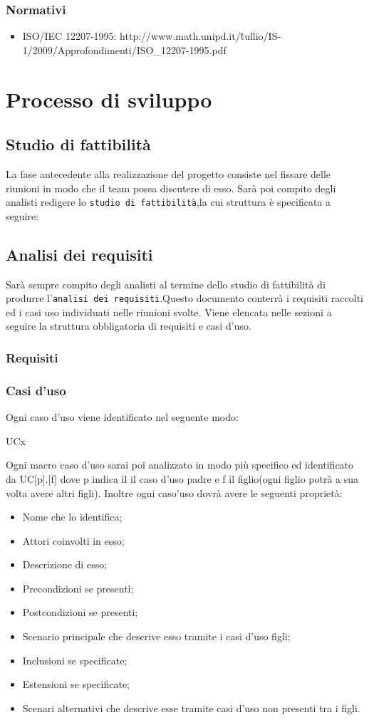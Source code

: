		\subsubsection{Normativi}
		\begin{itemize}
		\item ISO/IEC 12207-1995: http://www.math.unipd.it/\~tullio/IS-1/2009/Approfondimenti/ISO\_12207-1995.pdf
		\end{itemize}
\section{Processo di sviluppo}

	\subsection{Studio di fattibilità}
	La fase antecedente alla realizzazione del progetto consiste nel fissare delle riunioni in modo che il team possa discutere di esso. Sarà poi compito degli analisti redigere lo \texttt{studio di fattibilità},la cui struttura è specificata a seguire: %
	\subsection{Analisi dei requisiti}
	Sarà sempre compito degli analisti al termine dello studio di fattibilità di produrre l'\texttt{analisi dei requisiti}.Questo documento conterrà i requisiti raccolti ed i casi uso individuati nelle riunioni svolte.
	Viene elencata nelle sezioni a seguire la struttura obbligatoria di requisiti e casi d'uso.
		\subsubsection{Requisiti}
		\subsubsection{Casi d'uso}
		Ogni caso d'uso viene identificato nel seguente modo:
		\centerline{UCx}
		Ogni macro caso d'uso sarai poi analizzato in modo più specifico ed identificato da UC[p].[f] dove p indica il il caso d'uso padre e f il figlio(ogni figlio potrà a sua volta avere altri figli).
		Inoltre ogni caso'uso dovrà avere le seguenti proprietà:
		\begin{itemize}
		\item Nome che lo identifica;
		\item Attori coinvolti in esso;
		\item Descrizione di esso;
		\item Precondizioni se presenti;
		\item Postcondizioni se presenti;
		\item Scenario principale che descrive esso tramite i casi d'uso figli;
		\item Inclusioni se specificate;
		\item Estensioni se specificate;
		\item Scenari alternativi che descrive esse tramite casi d'uso non presenti tra i figli.
		\end{itemize}
